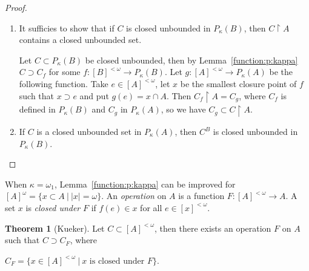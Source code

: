 \documentclass[8pt]{article}
\theoremstyle{definition}
\theoremstyle{definition}
\newtheorem{theorem}{Theorem}[section]
\theoremstyle{definition}
\theoremstyle{definition}
\theoremstyle{definition}
\theoremstyle{definition}
\theoremstyle{definition}
\theoremstyle{definition}
\theoremstyle{definition}
\theoremstyle{definition}
\theoremstyle{definition}
\theoremstyle{definition}
\theoremstyle{definition}
\theoremstyle{definition}
\theoremstyle{question}
\begin{document}
\begin{proof}
  $ $

  \begin{enumerate}
    \item It sufficies to show that if $C$ is closed unbounded in $P_{\kappa}(B)$, then
    $C \upharpoonright A$ contains a closed unbounded set.

    Let $C \subset P_{\kappa}(B)$ be closed unbounded, then by Lemma~\ref{function:p:kappa} 
    $C \supset C_f$ for some $f : [B]^{< \omega} \to P_{\kappa}(B)$. Let $g : [A]^{< \omega} \to P_{\kappa}(A)$
    be the following function. Take $e \in[A]^{< \omega}$, let $x$ be the smallest closure point of $f$
    such that $x \supset e$ and put $g(e) = x \cap A$. Then $C_f \upharpoonright A = C_g$, where $C_f$ is defined 
    in $P_{\kappa}(B)$ and $C_g$ in $P_{\kappa}(A)$, so we have $C_g \subset C \upharpoonright A$.
    \item If $C$ is a closed unbounded set in $P_{\kappa}(A)$, then $C^B$ is closed unbounded in $P_{\kappa}(B)$.
  \end{enumerate}
\end{proof}

When $\kappa = \omega_1$, Lemma~\ref{function:p:kappa} can be improved for $[A]^{\omega} = \{ x \subset A \: | \: |x| = \omega \}$.
An \emph{operation} on $A$ is a function $F : [A]^{< \omega} \to A$. A set $x$ is \emph{closed under} $F$
if $f(e) \in x$ for all $e \in [x]^{< \omega}$.

\begin{theorem}[Kueker]

  Let $C \subset [A]^{< \omega}$, then there exists an operation $F$ on $A$ such that $C \supset C_F$, where
  \begin{center}
    $C_F = \{ x \in [A]^{< \omega} \: | \: \text{$x$ is closed under $F$}\}$.
  \end{center}
\end{theorem}
\end{document}

